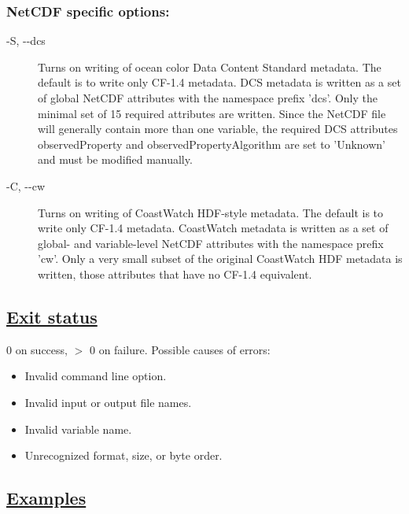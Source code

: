 \subsubsection*{NetCDF specific options:}
\begin{description}
\item[ -S, -{-}dcs ] Turns on writing of ocean color Data Content Standard metadata. The default is to write only CF-1.4 metadata. DCS metadata is written as a set of global NetCDF attributes with the namespace prefix 'dcs'. Only the minimal set of 15 required attributes are written. Since the NetCDF file will generally contain more than one variable, the required DCS attributes observedProperty and observedPropertyAlgorithm are set to 'Unknown' and must be modified manually.
\item[ -C, -{-}cw ] Turns on writing of CoastWatch HDF-style metadata. The default is to write only CF-1.4 metadata. CoastWatch metadata is written as a set of global- and variable-level NetCDF attributes with the namespace prefix 'cw'. Only a very small subset of the original CoastWatch HDF metadata is written, those attributes that have no CF-1.4 equivalent.

\end{description}
\subsection*{\underline{Exit status}}


  0 on success, $>$ 0 on failure. Possible causes of errors: \begin{itemize}
\item  Invalid command line option. 
\item  Invalid input or output file names. 
\item  Invalid variable name. 
\item  Unrecognized format, size, or byte order. 

\end{itemize}

\subsection*{\underline{Examples}}


